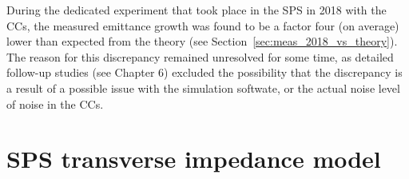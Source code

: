 
During the dedicated experiment that took place in the SPS
in 2018 with the CCs, the measured emittance
growth was found to be a factor four (on average) lower than
expected from the theory (see Section~\ref{sec:meas_2018_vs_theory}). The reason for this discrepancy remained unresolved for some time, as detailed follow-up studies (see Chapter 6) excluded the possibility that the discrepancy is a result of a possible issue with the simulation softwate, or the actual noise level of noise in the CCs.





\section{SPS transverse impedance model}



